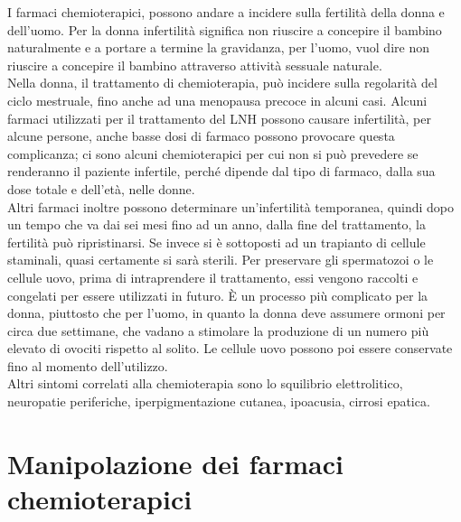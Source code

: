 I farmaci chemioterapici, possono andare a incidere sulla fertilità della donna e dell’uomo. Per la donna infertilità 
significa non riuscire a concepire il bambino naturalmente e a portare a termine la gravidanza, 
per l’uomo, vuol dire non riuscire a concepire il bambino attraverso attività sessuale naturale\cite{AMERICANFERTILITY}.\\
Nella donna, il trattamento di chemioterapia, può incidere sulla regolarità del ciclo mestruale, fino anche ad una 
menopausa precoce in alcuni casi. Alcuni farmaci utilizzati per il trattamento del LNH possono causare infertilità, 
per alcune persone, anche basse dosi di farmaco possono provocare questa complicanza; ci sono alcuni chemioterapici 
per cui non si può prevedere se renderanno il paziente infertile, perché dipende dal tipo di farmaco, 
dalla sua dose totale e dell’età, nelle donne\cite{UKFERTILITY}.\\
Altri farmaci inoltre possono determinare un’infertilità temporanea, quindi dopo un tempo che va dai sei mesi fino ad un anno, dalla fine del trattamento, la fertilità 
può ripristinarsi. Se invece si è sottoposti ad un trapianto di cellule staminali, quasi certamente si sarà sterili\cite{UKFERTILITY}.
Per preservare gli spermatozoi o le cellule uovo, prima di intraprendere il trattamento, essi vengono raccolti e 
congelati per essere utilizzati in futuro. È un processo più complicato per la donna, piuttosto che per l’uomo, 
in quanto la donna deve assumere ormoni per circa due settimane, che vadano a stimolare la produzione di un numero 
più elevato di ovociti rispetto al solito. Le cellule uovo possono poi essere conservate fino al momento dell’utilizzo.\\

Altri sintomi correlati alla chemioterapia sono lo squilibrio elettrolitico, neuropatie periferiche, 
iperpigmentazione cutanea, ipoacusia, cirrosi epatica.\\

\section{Manipolazione dei farmaci chemioterapici}

